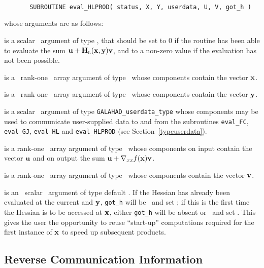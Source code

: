 \documentclass{galahad}
\newcommand{\bmHL}{\bmH\sub{L}}
\begin{document}
\def\baselinestretch{0.8}
{\tt
\begin{verbatim}
       SUBROUTINE eval_HLPROD( status, X, Y, userdata, U, V, got_h )
\end{verbatim} }
\def\baselinestretch{1.0}
\noindent whose arguments are as follows:

\begin{description}
 is a scalar \intentout\ argument of type \integer,
that should be set to 0 if the routine has been able to evaluate the
sum $\bmu + \bmHL(\bmx,\bmy) \bmv$,
and to a non-zero value if the evaluation has not been possible.

 is a \ rank-one \intentin\ array argument of type
\realdp\ whose components contain the vector ${\mathbf{x}}$.

 is a \ rank-one \intentin\ array argument of type
\realdp\ whose components contain the vector ${\mathbf{y}}$.

 is a scalar \intentinout\ argument of type
{\tt GALAHAD\_userdata\_type} whose components may be used
to communicate user-supplied data to and from the
subroutines {\tt eval\_FC}, {\tt eval\_GJ},
{\tt eval\_HL} and {\tt eval\_HLPROD}
(see Section~\ref{typeuserdata}).

 is a rank-one \intentinout\ array argument of type \realdp\
whose components on input contain the vector ${\mathbf{u}}$ and on output the
sum ${\mathbf{u}} + \nabla_{xx} f({\mathbf{x}}) {\mathbf{v}}$.

 is a rank-one \intentin\ array argument of type \realdp\
whose components contain the vector ${\mathbf{v}}$.

 is an \optional\ scalar \intentin\ argument of type default
\logical. If the Hessian has already been evaluated at the current 
and ${\mathbf{y}}$, {\tt got\_h} will be \present\ and set \true; if this is the 
first time the Hessian is to be accessed at ${\mathbf{x}}$, either {\tt got\_h} 
will be absent
or \present\ and set \false. This gives the user the opportunity
to reuse ``start-up'' computations required for the first instance of
${\mathbf{x}}$ to speed up subsequent products.

\end{description}



\subsection{\label{reverse}Reverse Communication Information}
\end{document}
